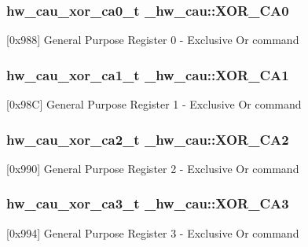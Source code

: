 \subsubsection[{\texorpdfstring{X\+O\+R\+\_\+\+C\+A0}{XOR_CA0}}]{ {\bf hw\+\_\+cau\+\_\+xor\+\_\+ca0\+\_\+t} \+\_\+hw\+\_\+cau\+::\+X\+O\+R\+\_\+\+C\+A0}\hypertarget{struct__hw__cau_a279810969623cec65d7adfceabffd829}{}\label{struct__hw__cau_a279810969623cec65d7adfceabffd829}
\mbox{[}0x988\mbox{]} General Purpose Register 0 -\/ Exclusive Or command 
\subsubsection[{\texorpdfstring{X\+O\+R\+\_\+\+C\+A1}{XOR_CA1}}]{ {\bf hw\+\_\+cau\+\_\+xor\+\_\+ca1\+\_\+t} \+\_\+hw\+\_\+cau\+::\+X\+O\+R\+\_\+\+C\+A1}\hypertarget{struct__hw__cau_a8773505f267a5c839095ec77b6d250eb}{}\label{struct__hw__cau_a8773505f267a5c839095ec77b6d250eb}
\mbox{[}0x98C\mbox{]} General Purpose Register 1 -\/ Exclusive Or command 
\subsubsection[{\texorpdfstring{X\+O\+R\+\_\+\+C\+A2}{XOR_CA2}}]{ {\bf hw\+\_\+cau\+\_\+xor\+\_\+ca2\+\_\+t} \+\_\+hw\+\_\+cau\+::\+X\+O\+R\+\_\+\+C\+A2}\hypertarget{struct__hw__cau_ab985fb4169741972d6d23a022c18d97b}{}\label{struct__hw__cau_ab985fb4169741972d6d23a022c18d97b}
\mbox{[}0x990\mbox{]} General Purpose Register 2 -\/ Exclusive Or command 
\subsubsection[{\texorpdfstring{X\+O\+R\+\_\+\+C\+A3}{XOR_CA3}}]{ {\bf hw\+\_\+cau\+\_\+xor\+\_\+ca3\+\_\+t} \+\_\+hw\+\_\+cau\+::\+X\+O\+R\+\_\+\+C\+A3}\hypertarget{struct__hw__cau_a895e0ae9f0f67070292bb705757cad97}{}\label{struct__hw__cau_a895e0ae9f0f67070292bb705757cad97}
\mbox{[}0x994\mbox{]} General Purpose Register 3 -\/ Exclusive Or command 
